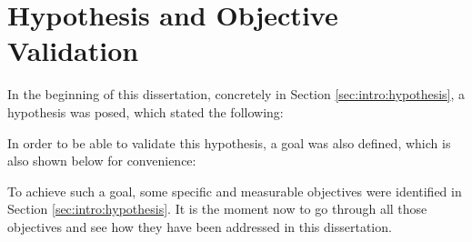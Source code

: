 \section{Hypothesis and Objective Validation}
\label{sec:conclusions:hypothesis}

In the beginning of this dissertation, concretely in Section \ref{sec:intro:hypothesis}, a hypothesis was posed, which stated the following:

\vspace{0.5cm}

\noindent{}

\vspace{0.5cm}

In order to be able to validate this hypothesis, a goal was also defined, which is also shown below for convenience:

\vspace{0.5cm}

\noindent{}

\vspace{0.5cm}

To achieve such a goal, some specific and measurable objectives were identified in Section \ref{sec:intro:hypothesis}. It is the moment now to go through all those objectives and see how they have been addressed in this dissertation. 

